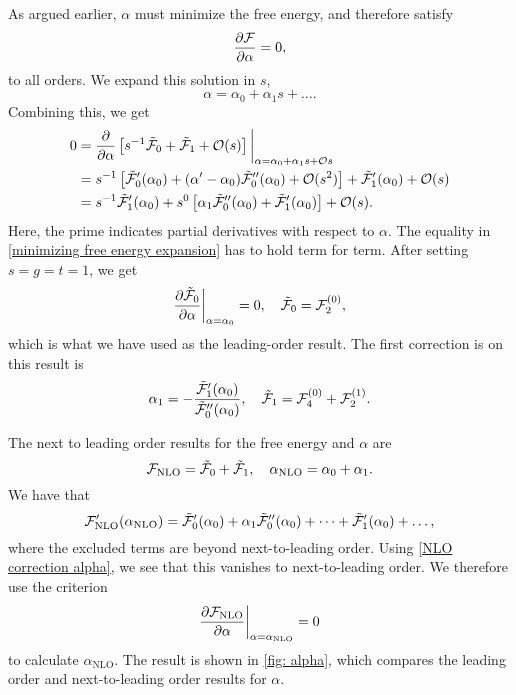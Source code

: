 %
As argued earlier, $\alpha$ must minimize the free energy, and therefore satisfy
%
\begin{equation}
    \pdv{\mathcal{F}}{\alpha} = 0,
\end{equation}
%
to all orders.
We expand this solution in $s$,
\begin{equation}
    \alpha = \alpha_0 + \alpha_1 s + \dots.
\end{equation}
%
Combining this, we get
%
\begin{align}
    \nonumber
    0 &
    = 
    \pdv{}{\alpha}
    \left[
        s^{-1}\tilde {\mathcal{F}}_0
        + 
        \tilde {\mathcal{F}}_1
        +
        \mathcal O(s)
    \right]
    \bigg|_{\alpha=\alpha_0 + \alpha_1 s + \mathcal O{s}} 
    \\ \nonumber
    & = 
    s^{-1 }
    \left[
        \tilde {\mathcal{F}}_0'(\alpha_0)
        +
        (\alpha' - \alpha_0)
        \tilde {\mathcal{F}}_0''(\alpha_0)
        +
        \mathcal O(s^2)
    \right]
    +
    \tilde{\mathcal{F}}_1'(\alpha_0)
    +
    \mathcal O(s) \\
    &
    =
    s^{-1} \tilde{\mathcal{F}}_1'(\alpha_0)
    + s^{0}
    \left[
        \alpha_1
        \tilde {\mathcal{F}}_0''(\alpha_0)
        +
    \tilde{\mathcal{F}}_1'(\alpha_0)
    \right]
    +
    \mathcal O(s).
    \label{minimizing free energy expansion}
\end{align}
%
Here, the prime indicates partial derivatives with respect to $\alpha$.
The equality in \autoref{minimizing free energy expansion} has to hold term for term.
After setting $s = g = t = 1$, we get
%
\begin{align*}
    \pdv{\tilde {\mathcal{F}}_0}{\alpha}\bigg|_{\alpha=\alpha_0} = 0, \quad
    \tilde {\mathcal{F}}_0 = \mathcal{F}_2^{(0)},
\end{align*}
%
which is what we have used as the leading-order result. 
The first correction is on this result is
%
\begin{equation}
    \label{NLO correction alpha}
    \alpha_1 = - \frac{\tilde {\mathcal{F}}_1'(\alpha_0)}{{\tilde {\mathcal{F}}_0''(\alpha_0)}},
    \quad 
    \tilde {\mathcal{F}}_1 = \mathcal{F}_{4}^{(0)} + \mathcal{F}_{2}^{(1)}.
\end{equation}
%

The next to leading order results for the free energy and $\alpha$ are
%
\begin{equation}
    \mathcal{F}_\mathrm{NLO} = \tilde {\mathcal{F}}_0 + \tilde {\mathcal{F}}_1, \quad
    \alpha_\mathrm{NLO} = \alpha_0 + \alpha_1.
\end{equation}
%
We have that
%
\begin{equation}
    \mathcal{F}_\mathrm{NLO}'(\alpha_\mathrm{NLO})
    = \tilde {\mathcal{F}}_0'(\alpha_0) + \alpha_1 \tilde {\mathcal{F}}_0''(\alpha_0) + \dots
    + \tilde {\mathcal{F}}_1'(\alpha_0) + \dots,
\end{equation}
%
where the excluded terms are beyond next-to-leading order.
Using \autoref{NLO correction alpha}, we see that this vanishes to next-to-leading order.
We therefore use the criterion
%
\begin{equation}
    \label{alpha nlo method 2}
    \pdv{\mathcal{F}_\mathrm{NLO}}{\alpha} \bigg|_{\alpha=\alpha_{\mathrm{NLO}}} = 0
\end{equation}
%
to calculate $\alpha_\text{NLO}$.
The result is shown in \autoref{fig: alpha}, which compares the leading order and next-to-leading order results for $\alpha$.

